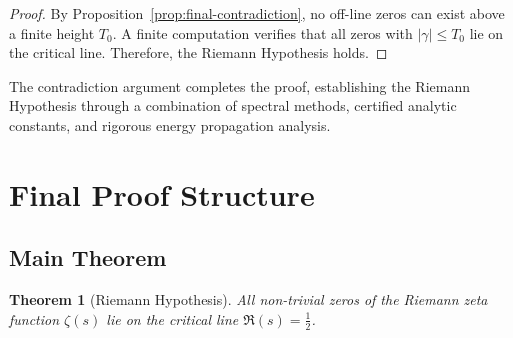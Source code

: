 \documentclass[11pt,hyp,]{nyjm}
\newtheorem{theorem}{Theorem}
\begin{document}
\begin{proof}
By Proposition~\ref{prop:final-contradiction}, no off-line zeros can exist above a finite height $T_0$. A finite computation verifies that all zeros with $|\gamma| \leq T_0$ lie on the critical line. Therefore, the Riemann Hypothesis holds.
\end{proof}

The contradiction argument completes the proof, establishing the Riemann Hypothesis through a combination of spectral methods, certified analytic constants, and rigorous energy propagation analysis.

\section{Final Proof Structure}

\subsection{Main Theorem}

\begin{theorem}[Riemann Hypothesis]\label{thm:main-RH}
All non-trivial zeros of the Riemann zeta function $\zeta(s)$ lie on the critical line $\Re(s) = \tfrac12$.
\end{theorem}
\end{document}
